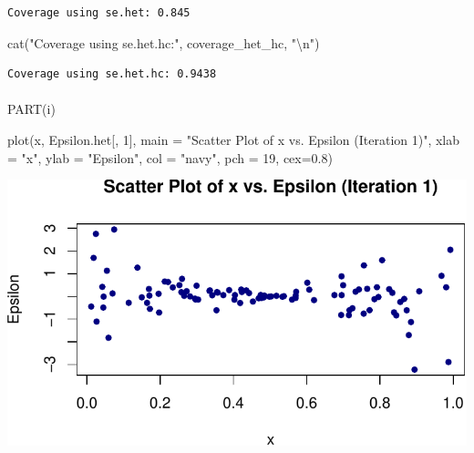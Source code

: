 \documentclass[
  11pt,
]{article}
\makeatletter
\let\oldparagraph\paragraph
\renewcommand{\paragraph}{
    \@ifstar
      \xxxParagraphStar
      \xxxParagraphNoStar
  }
\newcommand{\xxxParagraphStar}[1]{\oldparagraph*{#1}\mbox{}}
\newcommand{\xxxParagraphNoStar}[1]{\oldparagraph{#1}\mbox{}}
\newenvironment{Shaded}{\begin{snugshade}}{\end{snugshade}}
\newcommand{\AttributeTok}[1]{\textcolor[rgb]{0.40,0.45,0.13}{#1}}
\newcommand{\DecValTok}[1]{\textcolor[rgb]{0.68,0.00,0.00}{#1}}
\newcommand{\FloatTok}[1]{\textcolor[rgb]{0.68,0.00,0.00}{#1}}
\newcommand{\FunctionTok}[1]{\textcolor[rgb]{0.28,0.35,0.67}{#1}}
\newcommand{\NormalTok}[1]{\textcolor[rgb]{0.00,0.23,0.31}{#1}}
\newcommand{\SpecialCharTok}[1]{\textcolor[rgb]{0.37,0.37,0.37}{#1}}
\newcommand{\StringTok}[1]{\textcolor[rgb]{0.13,0.47,0.30}{#1}}
\makeatother
\begin{document}
\begin{verbatim}
Coverage using se.het: 0.845 
\end{verbatim}

\begin{Shaded}
\begin{Highlighting}[]
\FunctionTok{cat}\NormalTok{(}\StringTok{"Coverage using se.het.hc:"}\NormalTok{, coverage\_het\_hc, }\StringTok{"}\SpecialCharTok{\textbackslash{}n}\StringTok{"}\NormalTok{)}
\end{Highlighting}
\end{Shaded}

\begin{verbatim}
Coverage using se.het.hc: 0.9438 
\end{verbatim}

\paragraph{PART(i)}\label{parti}

\begin{Shaded}
\begin{Highlighting}[]
\FunctionTok{plot}\NormalTok{(x, Epsilon.het[, }\DecValTok{1}\NormalTok{], }\AttributeTok{main =} \StringTok{"Scatter Plot of x vs. Epsilon (Iteration 1)"}\NormalTok{, }
     \AttributeTok{xlab =} \StringTok{"x"}\NormalTok{, }\AttributeTok{ylab =} \StringTok{"Epsilon"}\NormalTok{, }\AttributeTok{col =} \StringTok{"navy"}\NormalTok{, }\AttributeTok{pch =} \DecValTok{19}\NormalTok{, }\AttributeTok{cex=}\FloatTok{0.8}\NormalTok{)}
\end{Highlighting}
\end{Shaded}

\includegraphics{HW-4-CODE-and-ANSWERS_files/figure-pdf/unnamed-chunk-18-1.pdf}
\end{document}
